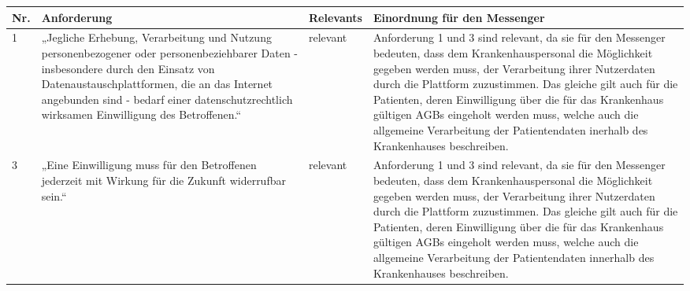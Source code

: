 \begin{longtable}{p{0.6cm}|p{6cm}|p{2cm}|p{6cm}}
    \hline
    Nr. & Anforderung                                                                                                                                                                                                                                                                                          & Relevants          & Einordnung für den Messenger                                                                                                                                                                                                                                                                                                                                                                                                                                                                                                                                        \\ \hline
    1      & „Jegliche Erhebung, Verarbeitung und Nutzung personenbezogener oder personenbeziehbarer Daten - insbesondere durch den Einsatz von Datenaustauschplattformen, die an das Internet angebunden sind - bedarf einer datenschutzrechtlich wirksamen Einwilligung des Betroffenen.“                       & relevant           & Anforderung 1 und 3 sind relevant, da sie für den Messenger bedeuten, dass dem Krankenhauspersonal die Möglichkeit gegeben werden muss, der Verarbeitung ihrer Nutzerdaten durch die Plattform zuzustimmen. Das gleiche gilt auch für die Patienten, deren Einwilligung über die für das Krankenhaus gültigen AGBs eingeholt werden muss, welche auch die allgemeine Verarbeitung der Patientendaten inerhalb des Krankenhauses beschreiben.                                                                                                                        \\ \hline
    3      & „Eine Einwilligung muss für den Betroffenen jederzeit mit Wirkung für die Zukunft widerrufbar sein.“                                                                                                                                                                                                 & relevant           & Anforderung 1 und 3 sind relevant, da sie für den Messenger bedeuten, dass dem Krankenhauspersonal die Möglichkeit gegeben werden muss, der Verarbeitung ihrer Nutzerdaten durch die Plattform zuzustimmen. Das gleiche gilt auch für die Patienten, deren Einwilligung über die für das Krankenhaus gültigen AGBs eingeholt werden muss, welche auch die allgemeine Verarbeitung der Patientendaten innerhalb des Krankenhauses beschreiben.                                                                                                                        \\ \hline

\end{longtable}
